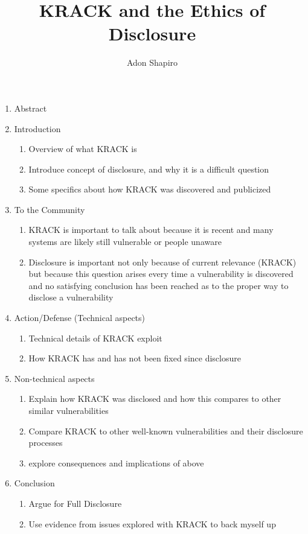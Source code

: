 \documentclass[12pt]{article}
\title{KRACK and the Ethics of Disclosure}
\author{Adon Shapiro}
\begin{document}
\maketitle

\begin{enumerate}
	\item Abstract
	\item Introduction
		\begin{enumerate}
		  \item Overview of what KRACK is
      \item Introduce concept of disclosure, and why it is a difficult question
      \item Some specifics about how KRACK was discovered and publicized
    \end{enumerate}
	\item To the Community
		\begin{enumerate}
      \item KRACK is important to talk about because it is recent and many
        systems are likely still vulnerable or people unaware
      \item Disclosure is important not only because of current relevance
        (KRACK) but because this question arises every time a vulnerability is
        discovered and no satisfying conclusion has been reached as to the
        proper way to disclose a vulnerability
    \end{enumerate}
  \item Action/Defense (Technical aspects)
    \begin{enumerate}
      \item Technical details of KRACK exploit
      \item How KRACK has and has not been fixed since disclosure
    \end{enumerate}
  \item Non-technical aspects
    \begin{enumerate}
      \item Explain how KRACK was disclosed and how this compares to other
        similar vulnerabilities
      \item Compare KRACK to other well-known vulnerabilities and their
        disclosure processes
      \item explore consequences and implications of above
    \end{enumerate}
  \item Conclusion
    \begin{enumerate}
      \item Argue for Full Disclosure
      \item Use evidence from issues explored with KRACK to back myself up
    \end{enumerate}
\end{enumerate}
\end{document}
